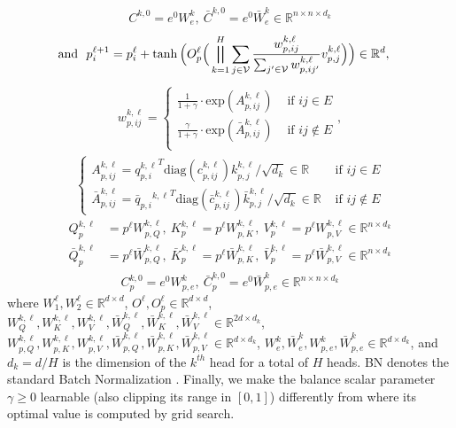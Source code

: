\documentclass{article} \usepackage{iclr2021_conference,times}
\begin{document}
\begin{eqnarray}
C^{k,0} \!=\! e^0 W_{e}^{k}, \ \bar{C}^{k,0} \!=\! e^0 \bar{W}_{e}^{k}\in\mathbb{R}^{n\times n\times d_k} 
\end{eqnarray}
\begin{align}
\text{and} \ \ {p}_{i}^{\ell+1}&= p_i^{\ell} + \tanh \Big( {O}_{p}^{\ell} \Big( \bigparallel_{k=1}^{H}\sum_{j \in \mathcal{V}} \frac{w_{p,i j}^{k, \ell}}{\sum_{j' \in \mathcal{V}} w_{p,i j'}^{k, \ell}} v_{p,j}^{k,\ell}\Big)\Big)\in\mathbb{R}^d,\label{eqn:san_lspe_5}
\end{align}
\begin{eqnarray}
w_{p,ij}^{k,\ell}=\left\{\begin{array}{ll}
\frac{1}{1+\gamma} \cdot \text{exp}(A_{p,ij}^{k,\ell}) & \textrm{ if } ij\in E  \\
\frac{\gamma}{1+\gamma} \cdot \text{exp}(\bar{A}_{p,ij}^{k,\ell}) & \textrm{ if } ij\not\in E \\
\end{array}\right.,\label{eqn:san_lspe_3a_p}
\end{eqnarray}
\begin{eqnarray}
\left\{
\begin{array}{ll}
A_{p,ij}^{k,\ell}={q_{p,i}^{k,\ell}}^T \textrm{diag}(c_{p,ij}^{k,\ell}) k_{p,j}^{k,\ell} / \sqrt{d_k}\in\mathbb{R} & \textrm{ if } ij\in E \\
\bar{A}_{p,ij}^{k,\ell}=\bar{q}_{p,i}{{}^{k,\ell}}^T\textrm{diag}({\bar{c}}_{p,ij}^{k,\ell}) {\bar{k}}_{p,j}^{k,\ell} / \sqrt{d_k}\in\mathbb{R} & \textrm{ if } ij\not\in E 
\end{array}
\right.
\end{eqnarray}
\begin{eqnarray}
Q_p^{k,\ell} &\!=\! p^\ell W_{p,Q}^{k,\ell},\
K_p^{k,\ell} \!=\! p^\ell W_{p,K}^{k,\ell},\
V_p^{k,\ell} \!=\! p^\ell W_{p,V}^{k,\ell}\in\mathbb{R}^{n\times d_k}\\
\bar{Q}_p^{k,\ell} &\!=\! p^\ell \bar{W}_{p,Q}^{k,\ell},\
\bar{K}_p^{k,\ell} \!=\! p^\ell \bar{W}_{p,K}^{k,\ell},\
\bar{V}_p^{k,\ell} \!=\! p^\ell \bar{W}_{p,V}^{k,\ell}\in\mathbb{R}^{n\times d_k}
\end{eqnarray}
\begin{eqnarray}
C_p^{k,0} \!=\! e^0 W_{p,e}^{k}, \ \bar{C}_p^{k,0} \!=\! e^0 \bar{W}_{p,e}^{k}\in\mathbb{R}^{n\times n\times d_k} 
\end{eqnarray}
where $W_1^{\ell}, W_2^{\ell} \in \mathbb{R}^{d \times d}$, $O^{\ell}, O_p^{\ell} \in \mathbb{R}^{d \times d}$, $W_Q^{k,\ell},W_K^{k,\ell},W_V^{k,\ell},\bar{W}_Q^{k,\ell},\bar{W}_K^{k,\ell},\bar{W}_V^{k,\ell} \in \mathbb{R}^{2d \times d_k}$, $W_{p,Q}^{k,\ell},W_{p,K}^{k,\ell},W_{p,V}^{k,\ell},\bar{W}_{p,Q}^{k,\ell},\bar{W}_{p,K}^{k,\ell},\bar{W}_{p,V}^{k,\ell} \in \mathbb{R}^{d \times d_k}$, $W_{e}^{k}, \bar{W}_{e}^{k}, W_{p,e}^{k}, \bar{W}_{p,e}^{k}\in \mathbb{R}^{d \times d_k}$, and $d_k = d/H$ is the dimension of the $k^{th}$ head for a total of $H$ heads. BN denotes the standard Batch Normalization \citep{ioffe2015batch}. Finally, we make the balance scalar parameter $\gamma\geq 0$ learnable (also clipping its range in $[0,1]$) differently from \citep{kreuzer2021rethinking} where its optimal value is computed by grid search. 
\end{document}
